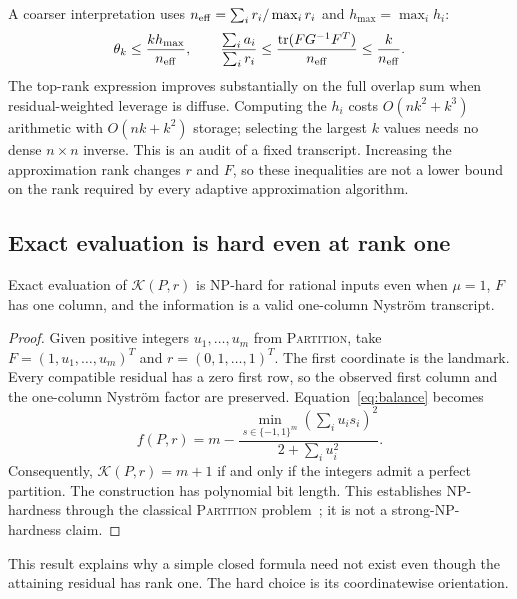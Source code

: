 \documentclass[final,leqno,letterpaper]{etna}
\newcommand{\tr}{\operatorname{tr}}
\newcommand{\opt}{\mathcal K}
\begin{document}
A coarser interpretation uses $n_{\rm eff}=\sum_i r_i/\max_i r_i$ and $h_{\max}=\max_i h_i$:
\begin{equation*}
 \theta_k\le \frac{k h_{\max}}{n_{\rm eff}},\qquad
 \frac{\sum_i a_i}{\sum_i r_i}
 \le\frac{\tr(FG^{-1}F^T)}{n_{\rm eff}}\le\frac{k}{n_{\rm eff}}.
\end{equation*}
The top-rank expression improves substantially on the full overlap sum when residual-weighted leverage is diffuse. Computing the $h_i$ costs $O(nk^2+k^3)$ arithmetic with $O(nk+k^2)$ storage; selecting the largest $k$ values needs no dense $n\times n$ inverse. This is an audit of a fixed transcript. Increasing the approximation rank changes $r$ and $F$, so these inequalities are not a lower bound on the rank required by every adaptive approximation algorithm.

\subsection{Exact evaluation is hard even at rank one}
\begin{proposition}\label{prop:hard}
Exact evaluation of $\opt(P,r)$ is NP-hard for rational inputs even when $\mu=1$, $F$ has one column, and the information is a valid one-column Nystr\"om transcript.
\end{proposition}
\begin{proof}
Given positive integers $u_1,\ldots,u_m$ from \textsc{Partition}, take
$F=(1,u_1,\ldots,u_m)^T$ and $r=(0,1,\ldots,1)^T$.
The first coordinate is the landmark. Every compatible residual has a zero first row, so the observed first column and the one-column Nystr\"om factor are preserved. Equation~\eqref{eq:balance} becomes
\begin{equation*}
 f(P,r)=m-\frac{\min_{s\in\{-1,1\}^m}(\sum_i u_i s_i)^2}{2+\sum_i u_i^2}.
\end{equation*}
Consequently, $\opt(P,r)=m+1$ if and only if the integers admit a perfect partition. The construction has polynomial bit length. This establishes NP-hardness through the classical \textsc{Partition} problem~\cite{karp}; it is not a strong-NP-hardness claim.
\end{proof}
This result explains why a simple closed formula need not exist even though the attaining residual has rank one. The hard choice is its coordinatewise orientation.
\end{document}
